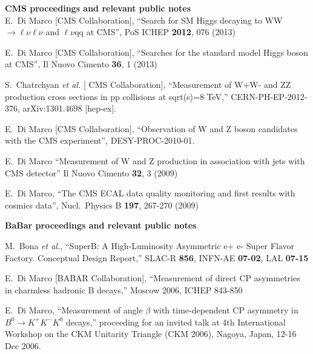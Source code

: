 {\bf CMS proceedings and relevant public notes}
\\

  E.~Di Marco [CMS Collaboration], 
  ``Search for SM Higgs decaying to WW $\to\ell\nu\ell\nu$ and $\ell\nu$qq at CMS'', 
  PoS ICHEP {\bf 2012}, 076 (2013)

  E.~Di Marco [CMS Collaboration],
  ``Searches for the standard model Higgs boson at CMS'',  
  Il Nuovo Cimento {\bf 36}, 1 (2013)

  S.~Chatrchyan {\it et al.}  [ CMS Collaboration],
  ``Measurement of W+W- and ZZ production cross sections in pp collisions at sqrt(s)=8 TeV,''
  CERN-PH-EP-2012-376, arXiv:1301.4698 [hep-ex].

  E.~Di Marco [CMS Collaboration],
  ``Observation of W and Z boson candidates with the CMS experiment'',
  DESY-PROC-2010-01.

 E.~Di Marco ``Measurement of W and Z
  production in association with jets with CMS detector'' Il Nuovo
  Cimento {\bf 32}, 3 (2009)

  E.~Di Marco,
  ``The CMS ECAL data quality monitoring and first results with cosmics data'',
  Nucl.\ Physics B {\bf 197}, 267-270 (2009)



{\bf BaBar proceedings and relevant public notes}

  M.~Bona {\it et al.},
  ``SuperB: A High-Luminosity Asymmetric e+ e- Super Flavor Factory. Conceptual Design Report,''
  SLAC-R {\bf 856}, INFN-AE {\bf 07-02}, LAL {\bf 07-15}

  E.~Di Marco  [BABAR Collaboration],
  ``Measurement of direct CP asymmetries in charmless hadronic B decays,''
  Moscow 2006, ICHEP 843-850 

  E.~Di Marco,
  ``Measurement of angle $\beta$ with time-dependent CP asymmetry in $B^0 \to K^+ K^-K^0$ decays,''
  proceeding for an invited talk at 4th International Workshop on the 
  CKM Unitarity Triangle (CKM 2006), Nagoya, Japan, 12-16 Dec 2006.






